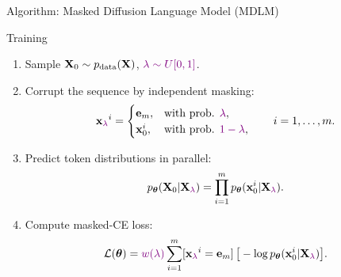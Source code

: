 \documentclass{beamer}
\begin{document}
\begin{frame}{Algorithm: Masked Diffusion Language Model (MDLM)}

	\begin{block}{Training}
		\begin{enumerate}
			\item Sample $\mathbf{X}_0 \sim p_{\text{data}}(\mathbf{X})$, ${\color{violet}\lambda \sim U[0, 1]}$.
			\item Corrupt the sequence by independent masking:
			\vspace{-0.3cm}
			\[
				\mathbf{x}_{\color{violet}\lambda}^i =
				\begin{cases}
					\mathbf e_m, & \text{with prob. }{\color{violet}\lambda},\\
					\mathbf{x}_0^i, & \text{with prob. }{\color{violet}1-\lambda},
				\end{cases}
				\qquad i=1,\dots,m.
			\]
			\vspace{-0.5cm}
			\item Predict token distributions in parallel:
			\vspace{-0.3cm}
			\[
				p_{\boldsymbol{\theta}}(\mathbf{X}_0 | \mathbf{X}_{\color{violet}\lambda})
				=
				\prod_{i=1}^m p_{\boldsymbol{\theta}}(\mathbf{x}_0^i | \mathbf{X}_{\color{violet}\lambda}).
			\]
			\vspace{-0.5cm}
			\item Compute masked-CE loss:
			\vspace{-0.3cm}
			\[
				\mathcal{L}(\boldsymbol{\theta})
				=
				{\color{violet}w(\lambda)} \sum_{i=1}^m [\mathbf{x}_{\color{violet}\lambda}^i=\mathbf e_m]\,
				\big[-\log p_{\boldsymbol{\theta}}(\mathbf{x}_0^i | \mathbf{X}_{\color{violet}\lambda})\big].
			\]
		\end{enumerate}
	\end{block}

\end{frame}
\end{document}
